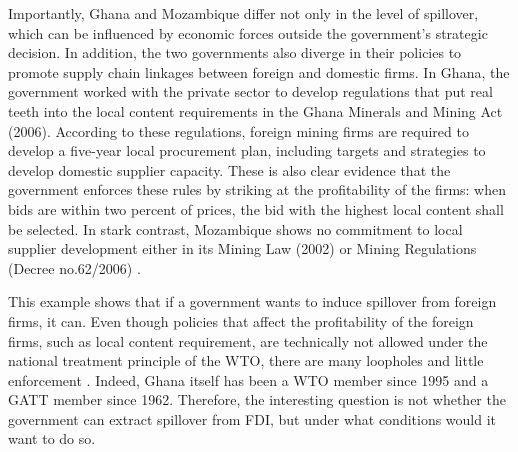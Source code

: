 Importantly, Ghana and Mozambique differ not only in the level of spillover, which can be influenced by economic forces outside the government's strategic decision. In addition, the two governments also diverge in their policies to promote supply chain linkages between foreign and domestic firms. In Ghana, the government worked with the private sector to develop regulations that put real teeth into the local content requirements in the Ghana Minerals and Mining Act (2006). According to these regulations, foreign mining firms are required to develop a five-year local procurement plan, including targets and strategies to develop domestic supplier capacity. These is also clear evidence that the government enforces these rules by striking at the profitability of the firms: when bids are within two percent of prices, the bid with the highest local content shall be selected. In stark contrast, Mozambique shows no commitment to local supplier development either in its Mining Law (2002) or Mining Regulations (Decree no.62/2006) \citep[137]{Farole2014}.

This example shows that if a government wants to induce spillover from foreign firms, it can. Even though policies that affect the profitability of the foreign firms, such as local content requirement, are technically not allowed under the national treatment principle of the WTO, there are many loopholes and little enforcement \citep{Hufbauer2013}. Indeed, Ghana itself has been a WTO member since 1995 and a GATT member since 1962. Therefore, the interesting question is not whether the government can extract spillover from FDI, but under what conditions would it want to do so.
